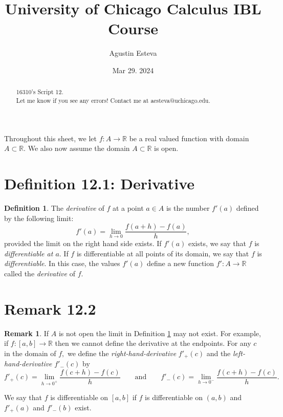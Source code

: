 \documentclass[openany, amssymb, psamsfonts]{amsart}
\title{University of Chicago Calculus IBL Course}
\author{Agustin Esteva}
\date{Mar 29. 2024}
\newcommand{\bbR}{\mathbb{R}}
\theoremstyle{definition}
\newtheorem{defn}{Definition}[section]
\newtheorem{rem}{Remark}[section]
\numberwithin{equation}{section}
\begin{document}
\begin{abstract}

16310's Script 12.\\ Let me know if you see any errors! Contact me at aesteva@uchicago.edu.


\end{abstract}

\maketitle

\tableofcontents

\setcounter{section}{12}
Throughout this sheet, we let $f\colon A \to \bbR$ be a real valued function with domain $A \subset \bbR$. We also now assume the domain $A \subset \bbR$ is open. 
\section*{Definition 12.1: Derivative}
\begin{defn}\label{12.1}
	The \emph{derivative} of $f$ at a point $a \in A$ is the number $f'(a)$ defined by the following limit:
	\[
		f'(a) = \lim_{h \to 0} \frac{f(a + h) - f(a)}{h}, 
	\]
	provided the limit on the right hand side exists.
	If $f'(a)$ exists, we say that $f$ is \emph{differentiable at $a$}. If $f$ is differentiable at all points of its domain, we say that $f$ is \emph{differentiable}. In this case, the values $f'(a)$ define a new function $f'\colon A \to \bbR$ called the \emph{derivative} of $f$.
\end{defn}

\section*{Remark 12.2}
\begin{rem} \label{12.2}If $A$ is not open the limit in Definition \ref{12.1} may not exist. For example, if $f\colon [a,b]\to \bbR$ then we cannot define the derivative at the endpoints. 
 For any $c$ in the domain of $f,$ we define the {\em right-hand-derivative} $f'_{+}(c)$ and the {\em left-hand-derivative} $f'_{-}(c)$  by
$$f'_{+}(c)=\lim_{h\to 0^+} \frac{f(c+h)-f(c)}{h}\qquad \text{and} \qquad f'_{-}(c)= \lim_{h\to 0^{-}}\frac{f(c+h)-f(c)}{h}.$$

 We say that $f$ is differentiable on $[a,b]$ if $f$ is differentiable on $(a,b)$ and $f'_{+}(a)$ and  $f'_{-}(b)$ exist. 
\end{rem}
\end{document}
